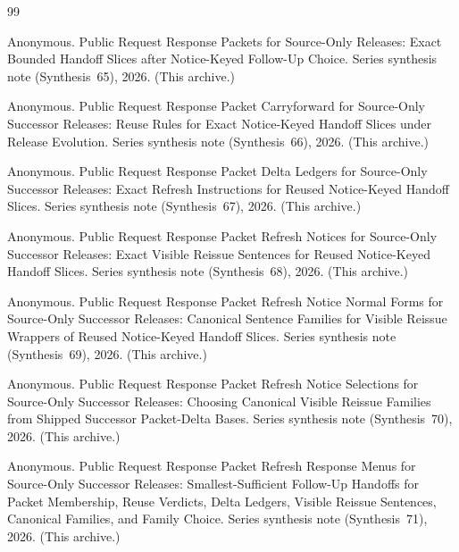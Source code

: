 \documentclass[11pt]{article}
\begin{document}
\begin{thebibliography}{99}\small

Anonymous.
\newblock Public Request Response Packets for Source-Only Releases: Exact Bounded Handoff Slices after Notice-Keyed Follow-Up Choice.
\newblock Series synthesis note (Synthesis~65), 2026. (This archive.)

Anonymous.
\newblock Public Request Response Packet Carryforward for Source-Only Successor Releases: Reuse Rules for Exact Notice-Keyed Handoff Slices under Release Evolution.
\newblock Series synthesis note (Synthesis~66), 2026. (This archive.)

Anonymous.
\newblock Public Request Response Packet Delta Ledgers for Source-Only Successor Releases: Exact Refresh Instructions for Reused Notice-Keyed Handoff Slices.
\newblock Series synthesis note (Synthesis~67), 2026. (This archive.)

Anonymous.
\newblock Public Request Response Packet Refresh Notices for Source-Only Successor Releases: Exact Visible Reissue Sentences for Reused Notice-Keyed Handoff Slices.
\newblock Series synthesis note (Synthesis~68), 2026. (This archive.)

Anonymous.
\newblock Public Request Response Packet Refresh Notice Normal Forms for Source-Only Successor Releases: Canonical Sentence Families for Visible Reissue Wrappers of Reused Notice-Keyed Handoff Slices.
\newblock Series synthesis note (Synthesis~69), 2026. (This archive.)

Anonymous.
\newblock Public Request Response Packet Refresh Notice Selections for Source-Only Successor Releases: Choosing Canonical Visible Reissue Families from Shipped Successor Packet-Delta Bases.
\newblock Series synthesis note (Synthesis~70), 2026. (This archive.)

Anonymous.
\newblock Public Request Response Packet Refresh Response Menus for Source-Only Successor Releases: Smallest-Sufficient Follow-Up Handoffs for Packet Membership, Reuse Verdicts, Delta Ledgers, Visible Reissue Sentences, Canonical Families, and Family Choice.
\newblock Series synthesis note (Synthesis~71), 2026. (This archive.)


\end{thebibliography}
\end{document}
